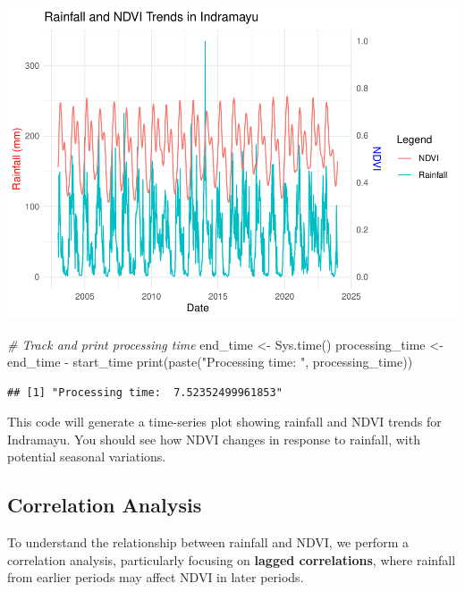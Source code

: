 \documentclass[
]{article}
\newenvironment{Shaded}{}{}
\newcommand{\CommentTok}[1]{\textcolor[rgb]{0.38,0.63,0.69}{\textit{#1}}}
\newcommand{\FunctionTok}[1]{\textcolor[rgb]{0.02,0.16,0.49}{#1}}
\newcommand{\NormalTok}[1]{#1}
\newcommand{\OtherTok}[1]{\textcolor[rgb]{0.00,0.44,0.13}{#1}}
\newcommand{\SpecialCharTok}[1]{\textcolor[rgb]{0.25,0.44,0.63}{#1}}
\newcommand{\StringTok}[1]{\textcolor[rgb]{0.25,0.44,0.63}{#1}}
\begin{document}
\begin{center}\includegraphics{BI_VegetationResponse_Project_HarvardX_Ph125_9x_files/figure-latex/eda_rain_ndvi_trend-1} \end{center}

\begin{Shaded}
\begin{Highlighting}[]
\CommentTok{\# Track and print processing time}
\NormalTok{end\_time }\OtherTok{\textless{}{-}} \FunctionTok{Sys.time}\NormalTok{()}
\NormalTok{processing\_time }\OtherTok{\textless{}{-}}\NormalTok{ end\_time }\SpecialCharTok{{-}}\NormalTok{ start\_time}
\FunctionTok{print}\NormalTok{(}\FunctionTok{paste}\NormalTok{(}\StringTok{"Processing time: "}\NormalTok{, processing\_time))}
\end{Highlighting}
\end{Shaded}

\begin{verbatim}
## [1] "Processing time:  7.52352499961853"
\end{verbatim}

This code will generate a time-series plot showing rainfall and NDVI
trends for Indramayu. You should see how NDVI changes in response to
rainfall, with potential seasonal variations.

\subsection{Correlation Analysis}\label{correlation-analysis}

To understand the relationship between rainfall and NDVI, we perform a
correlation analysis, particularly focusing on \textbf{lagged
correlations}, where rainfall from earlier periods may affect NDVI in
later periods.
\end{document}
